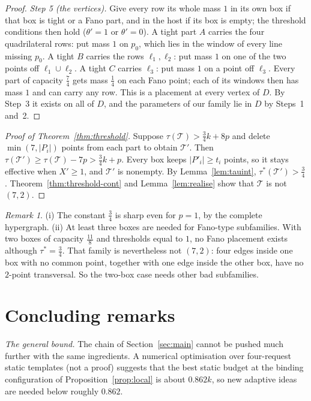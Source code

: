 \documentclass[11pt]{amsart}
\theoremstyle{definition}
\theoremstyle{remark}
\newtheorem{remark}[theorem]{Remark}
\begin{document}
\begin{proof}
\emph{Step 5 (the vertices).} Give every row its whole mass $1$ in its own box if that box is tight or a Fano part, and in the host if its box is empty; the threshold conditions then hold ($\theta'=1$ or $\theta'=0$). A tight part $A$ carries the four quadrilateral rows: put mass $1$ on $p_0$, which lies in the window of every line missing $p_0$. A tight $B$ carries the rows $\ell_1,\ell_2$: put mass $1$ on one of the two points off $\ell_1\cup\ell_2$. A tight $C$ carries $\ell_3$: put mass $1$ on a point off $\ell_3$. Every part of capacity $\frac74$ gets mass $\frac14$ on each Fano point; each of its windows then has mass $1$ and can carry any row. This is a placement at every vertex of $D$. By Step~3 it exists on all of $D$, and the parameters of our family lie in $D$ by Steps~1 and~2.
\end{proof}

\begin{proof}[Proof of Theorem~\ref{thm:threshold}]
Suppose $\tau(\mathcal T)>\frac34k+8p$ and delete $\min(7,|P_i|)$ points from each part to obtain $\mathcal T'$. Then $\tau(\mathcal T')\ge\tau(\mathcal T)-7p>\frac34k+p$. Every box keeps $|P'_i|\ge t_i$ points, so it stays effective when $X'\ge1$, and $\mathcal T'$ is nonempty. By Lemma~\ref{lem:tauint}, $\tau^*(\mathcal T')>\frac34$. Theorem~\ref{thm:threshold-cont} and Lemma~\ref{lem:realise} show that $\mathcal T$ is not $(7,2)$.
\end{proof}

\begin{remark}\label{rem:threshold}
(i) The constant $\frac34$ is sharp even for $p=1$, by the complete hypergraph.
(ii) At least three boxes are needed for Fano-type subfamilies. With two boxes of capacity $\frac{11}8$ and thresholds equal to $1$, no Fano placement exists although $\tau^*=\frac34$. That family is nevertheless not $(7,2)$: four edges inside one box with no common point, together with one edge inside the other box, have no $2$-point transversal. So the two-box case needs other bad subfamilies.
\end{remark}


\section{Concluding remarks}

\emph{The general bound.} The chain of Section~\ref{sec:main} cannot be pushed much further with the same ingredients. A numerical optimisation over four-request static templates (not a proof) suggests that the best static budget at the binding configuration of Proposition~\ref{prop:local} is about $0.862k$, so new adaptive ideas are needed below roughly $0.862$.
\end{document}
